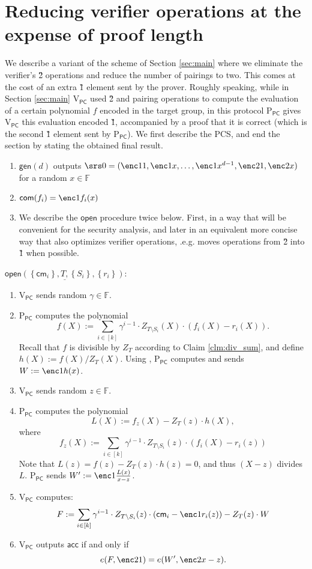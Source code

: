 \documentclass[11pt]{article} %
\newcommand{\F}{\ensuremath{\mathbb F}\xspace}
\newcommand{\com}{\ensuremath{\mathsf{com}}\xspace}
\newcommand{\cm}{\ensuremath{\mathsf{cm}}\xspace}
\newcommand{\open}{\ensuremath{\mathsf{open}}\xspace}
\newcommand{\acc}{\ensuremath{\mathsf{acc}}\xspace}
\newcommand{\defeq}{:=}
\newcommand{\gen}{\ensuremath{\mathsf{gen}}\xspace}
\newcommand{\prvpc}{\ensuremath{\mathrm{P_{\mathsf{PC}}}}\xspace}
\newcommand{\verpc}{\ensuremath{\mathrm{V_{\mathsf{PC}}}}\xspace}
\newcommand{\set}[1]{\ensuremath{\left\{#1\right\}}\xspace}
\begin{document}
\newpage
\section{Reducing verifier operations at the expense of proof length}\label{sec:secondpcs}

We describe a variant of the scheme of Section \ref{sec:main} where we eliminate the verifier's \G2 operations and reduce the number of pairings to two. This comes at the cost of an extra \G1 element sent by the prover. Roughly speaking, while in Section \ref{sec:main} \verpc used \G2 and pairing operations to compute the evaluation of a certain polynomial $f$ encoded in the target group, in this protocol \prvpc gives \verpc this evaluation encoded \G1, accompanied by a proof that it is correct (which is the second \G1 element sent by \prvpc).
We first describe the PCS, and end the section by stating the obtained final result.


\begin{enumerate}
\item $\gen(d)$ outputs $\srs0 =(\enc1{1},\enc1{x},\ldots,\enc1{x^{d-1}},\enc2{1},\enc2{x})$ for a random $x\in \F$
\item $\com(f_i)=\enc1{f_i(x)}$
\item We describe the \open procedure twice below. First, in a way that will be convenient for the security analysis, and later in an equivalent more concise way that also optimizes verifier operations, .e.g. moves operations from \G2 into \G1 when possible.
\end{enumerate}

\noindent
$\underline{\open(\set{\cm_i},T,\set{S_i},\set{r_i})}$:
\begin{enumerate}
  \item \verpc sends random $\gamma\in \F$.
 \item \prvpc computes the polynomial
 \[f(X)\defeq \sum_{i\in [k]} \gamma^{i-1}\cdot Z_{T\setminus S_i}(X)\cdot (f_i(X)-r_i(X)).\]
 Recall that $f$ is divisible by $Z_T$ according to Claim \ref{clm:div_sum}, and define
 $h(X)\defeq f(X)/Z_T(X)$.
 Using , \prvpc computes and sends $W\defeq \enc1{h(x)}$.
 \item \verpc sends random $z\in \F$.

\item \prvpc computes the polynomial
\[L(X)\defeq f_z(X) - Z_T(z)\cdot h(X),\]
where 
\[f_z(X)\defeq \sum_{i\in [k]} \gamma^{i-1}\cdot Z_{T\setminus S_i}(z)\cdot (f_i(X)-r_i(z))\]
Note that $L(z)= f(z)- Z_T(z)\cdot h(z) =0$, and thus $(X-z)$ divides $L$.
\prvpc sends $W'\defeq \enc1{\frac{L(x)}{x-z}}$.

\item \verpc computes:
\[F\defeq \sum_{i\in [k]} \gamma^{i-1} \cdot Z_{T\setminus S_i}(z)\cdot (\cm_i - \enc1{r_i(z)}) - Z_T(z)\cdot W \]
 \item\label{stp:verchecksecond} \verpc outputs \acc if and only if
 \[ e(F,\enc2{1}) = e(W',\enc2{x-z}).\]

\end{enumerate}
\end{document}
